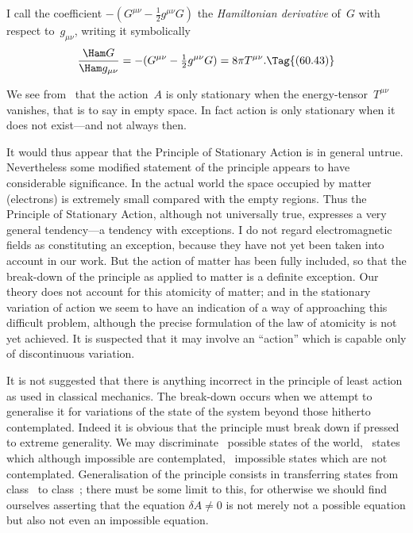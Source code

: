 \documentclass[12pt]{book}
\begin{document}
I call the coefficient $-(G^{\mu\nu} - \frac{1}{2}g^{\mu\nu}G)$ the \emph{Hamiltonian derivative} of~$G$ with
%
%
%
respect to~$g_{\mu\nu}$, writing it symbolically
\[
\frac{\Ham G}{\Ham g_{\mu\nu}}
  = -(G^{\mu\nu} - \tfrac{1}{2}g^{\mu\nu}G)
  = 8\pi T^{\mu\nu}.
  \Tag{(60.43)}
\]

We see from~ that the action~$A$ is only stationary when the energy-tensor~$T^{\mu\nu}$
%
%
vanishes, that is to say in empty space. In fact action is only
stationary when it does not exist---and not always then.

It would thus appear that the Principle of Stationary Action is in general
%
untrue. Nevertheless some modified statement of the principle appears to
have considerable significance. In the actual world the space occupied by
matter (electrons) is extremely small compared with the empty regions. Thus
the Principle of Stationary Action, although not universally true, expresses a
very general tendency---a tendency with exceptions\footnotemark.\footnotetext
  {I do not regard electromagnetic fields as constituting an exception, because they have not
  yet been taken into account in our work. But the action of matter has been fully included, so
  that the break-down of the principle as applied to matter is a definite exception.}
Our theory does not
account for this atomicity of matter; and in the stationary variation of action
%
we seem to have an indication of a way of approaching this difficult problem,
although the precise formulation of the law of atomicity is not yet achieved.
It is suspected that it may involve an ``action'' which is capable only of
discontinuous variation.

It is not suggested that there is anything incorrect in the principle of
least action as used in classical mechanics. The break-down occurs when we
attempt to generalise it for variations of the state of the system beyond those
hitherto contemplated. Indeed it is obvious that the principle must break
down if pressed to extreme generality. We may discriminate ~possible
states of the world, ~states which although impossible are contemplated,
~impossible states which are not contemplated. Generalisation of the principle
consists in transferring states from class~ to class~; there must be
some limit to this, for otherwise we should find ourselves asserting that the
equation $\delta A \neq 0$ is not merely not a possible equation but also not even an
impossible equation.
\end{document}
